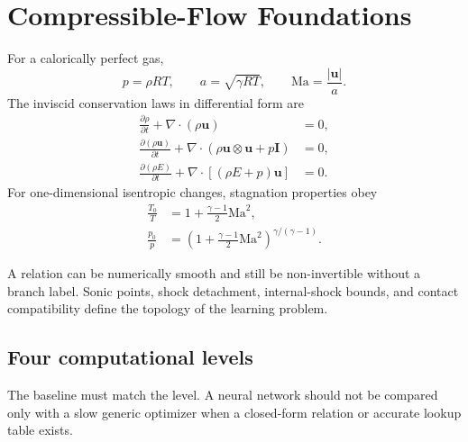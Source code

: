 \documentclass[11pt]{article}
\newcommand{\Ma}{\mathrm{Ma}}
\begin{document}
\section{Compressible-Flow Foundations}
For a calorically perfect gas,
\begin{equation}
p=\rho RT,\qquad a=\sqrt{\gamma RT},\qquad \Ma=\frac{|\bm u|}{a}.
\end{equation}
The inviscid conservation laws in differential form are
\begin{align}
\frac{\partial \rho}{\partial t}+\nabla\cdot(\rho\bm u)&=0,\\
\frac{\partial (\rho\bm u)}{\partial t}
+\nabla\cdot(\rho\bm u\otimes\bm u+p\bm I)&=0,\\
\frac{\partial (\rho E)}{\partial t}
+\nabla\cdot[(\rho E+p)\bm u]&=0.
\end{align}
For one-dimensional isentropic changes, stagnation properties obey
\begin{align}
\frac{T_0}{T}&=1+\frac{\gamma-1}{2}\Ma^2,\\
\frac{p_0}{p}&=\left(1+\frac{\gamma-1}{2}\Ma^2\right)^{\gamma/(\gamma-1)}.
\end{align}

\begin{warningbox}
A relation can be numerically smooth and still be non-invertible without a
branch label. Sonic points, shock detachment, internal-shock bounds, and contact
compatibility define the topology of the learning problem.
\end{warningbox}

\subsection{Four computational levels}
\begin{center}
\end{center}
The baseline must match the level. A neural network should not be compared only
with a slow generic optimizer when a closed-form relation or accurate lookup table exists.
\end{document}
